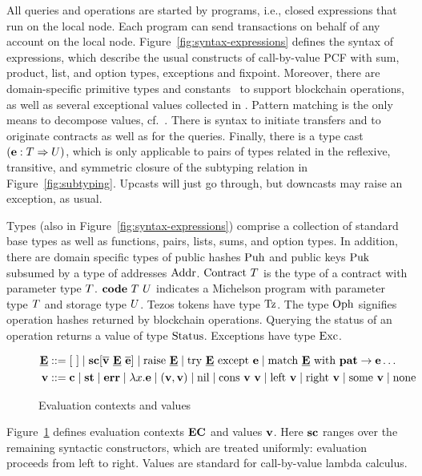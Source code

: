 \documentclass[a4paper]{llncs}
\begin{document}
All queries and operations are started by programs, i.e., closed expressions that run on the
local node. Each program can send transactions on behalf of any
account on the local node.  Figure~\ref{fig:syntax-expressions} defines the syntax of
expressions, which describe the usual constructs of call-by-value PCF
with sum, product, list, and option types, exceptions and fixpoint. Moreover, there are
domain-specific primitive types and constants \CONSTANT\ to support blockchain
operations, as well as several exceptional values collected in \ERROR.
Pattern matching is the only means to decompose values, cf.\ \PATTERN.
There is syntax to initiate transfers and to originate contracts as
well as for the queries. Finally, there is a type cast
$(\textbf{e} : T \Rightarrow U)$, which is only applicable to pairs of
types related in the reflexive, transitive, and symmetric closure of
the subtyping relation in Figure~\ref{fig:subtyping}. Upcasts will
just go through, but downcasts may raise an exception, as usual.

Types (also in Figure~\ref{fig:syntax-expressions}) comprise a
collection of standard base types as well as 
functions, pairs, lists, sums, and option types. In addition, there
are domain specific types of public hashes $\text{Puh}$ and public keys $\text{Puk}$ subsumed by
a type of addresses $\text{Addr}$. $\text{Contract}\ T$ is the type of
a contract with parameter type $T$. $\textbf{code}\ T\ U$
indicates a Michelson program with parameter type $T$ and storage
type $U$. Tezos tokens have type $\text{Tz}$. The type $\text{Oph}$ signifies operation hashes
returned by blockchain operations. Querying the status of an operation
returns a value of type $\text{Status}$. Exceptions have type
$\text{Exc}$. 

\begin{figure}[tp]
\begin{align*}
  \ECN{} & :: = \ECHOLE \mid \SC[\overline\VAL\ \ECN{}\ \overline\EXPR] \mid \RAISE\ \ECN{} \mid \TRY\ \ECN{}\ \EXCEPT\ \EXPR
  \mid \MATCH\ \ECN{}\ \WITH\ \PATTERN\to\EXPR \dots
  \\
  \VAL & ::= \CONSTANT \mid \STATUS \mid \ERROR \mid \lambda x.\EXPR \mid(\VAL, \VAL) \mid
         \NIL \mid \CONS\ \VAL\ \VAL \mid \LEFT\ \VAL \mid \RIGHT\
         \VAL \mid \SOME\ \VAL\mid \NONE
\end{align*}
  \caption{Evaluation contexts and values}
  \label{fig:evaluation-contexts-values}
\end{figure}
Figure~\ref{fig:evaluation-contexts-values} defines evaluation
contexts $\textbf{EC}$ and values $\textbf{v}$.
Here $\textbf{sc}$ ranges over the remaining syntactic constructors, which are
treated uniformly: evaluation proceeds from left to right. Values are
standard for call-by-value lambda calculus.
\end{document}
